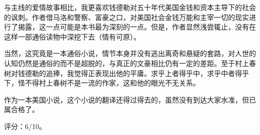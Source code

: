 与主线的爱情故事相比，我更喜欢钱德勒对五十年代美国金钱和资本主导下的社会的讽刺。作者借马洛和警察、富豪之口，对美国社会金钱万能和主宰一切的现实进行了揭露，这一点可能是本书最为深刻的一点。但是，作者显然浅尝辄止，没有在这样一部通俗读物中深挖下去（情有可原）。

当然，这究竟是一本通俗小说，情节本身并没有逃出离奇和悬疑的套路，对人世的认知仍然是通俗的而不是超脱的，与真正的文豪相比仍有一定的差距。至于村上春树对钱德勒的追捧，我觉得正表现出他的平庸。求乎上者得乎中，求乎中者得乎下，怪不得村上春树不是一流的作家，这和他的眼光不无关系。

作为一本美国小说，这个小说的翻译还得过得去的，虽然没有到达大家水准，但已属合格了。

评分：6/10。